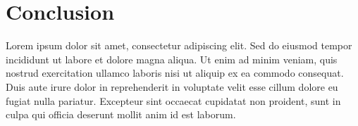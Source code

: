 \documentclass[
    a4paper, %
    10pt, %
    unnumberedsections, %
    twoside, %
]{LTJournalArticle}
\begin{document}

\section{Conclusion}

Lorem ipsum dolor sit amet, consectetur adipiscing elit. Sed do eiusmod tempor incididunt ut labore et dolore magna aliqua. Ut enim ad minim veniam, quis nostrud exercitation ullamco laboris nisi ut aliquip ex ea commodo consequat. Duis aute irure dolor in reprehenderit in voluptate velit esse cillum dolore eu fugiat nulla pariatur. Excepteur sint occaecat cupidatat non proident, sunt in culpa qui officia deserunt mollit anim id est laborum.


\printbibliography %

\end{document}
